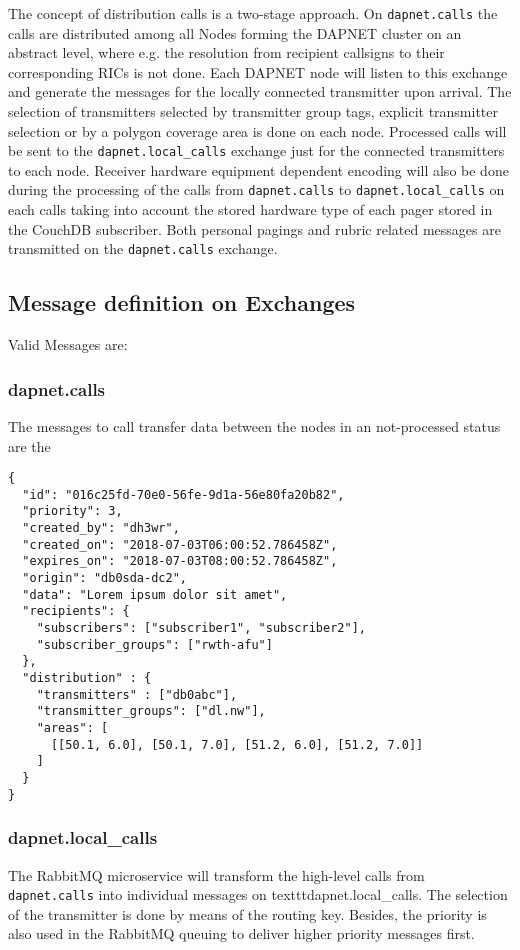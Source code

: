 The concept of distribution calls is a two-stage approach. On \texttt{dapnet.calls} the calls are distributed among all Nodes forming the DAPNET cluster on an abstract level, where e.g. the resolution from recipient callsigns to their corresponding RICs is not done. Each DAPNET node will listen to this exchange and generate the messages for the locally connected transmitter upon arrival. The selection of transmitters selected by transmitter group tags, explicit transmitter selection or by a polygon coverage area is done on each node. Processed calls will be sent to the \texttt{dapnet.local\_calls} exchange just for the connected transmitters to each node. Receiver hardware equipment dependent encoding will also be done during the processing of the calls from \texttt{dapnet.calls} to \texttt{dapnet.local\_calls} on each calls taking into account the stored hardware type of each pager stored in the CouchDB subscriber. Both personal pagings and rubric related messages are transmitted on the \texttt{dapnet.calls} exchange.


\subsection{Message definition on Exchanges}
\label{protocoldef:RabbitMQ:exchangesdifinition}


Valid Messages are:

\subsubsection{dapnet.calls}
\label{protocoldef:RabbitMQ:dapnet.calls}
The messages to call transfer data between the nodes in an not-processed status are the
\begin{lstlisting}
{
  "id": "016c25fd-70e0-56fe-9d1a-56e80fa20b82",
  "priority": 3,
  "created_by": "dh3wr",
  "created_on": "2018-07-03T06:00:52.786458Z",
  "expires_on": "2018-07-03T08:00:52.786458Z",
  "origin": "db0sda-dc2",
  "data": "Lorem ipsum dolor sit amet",
  "recipients": {
    "subscribers": ["subscriber1", "subscriber2"],
    "subscriber_groups": ["rwth-afu"]
  },
  "distribution" : {
    "transmitters" : ["db0abc"],
    "transmitter_groups": ["dl.nw"],
    "areas": [
      [[50.1, 6.0], [50.1, 7.0], [51.2, 6.0], [51.2, 7.0]]
    ]
  }
}
\end{lstlisting}

\subsubsection{dapnet.local\_calls}
\label{protocoldef:RabbitMQ:dapnet.local_calls}
The RabbitMQ microservice will transform the high-level calls from \texttt{dapnet.calls} into individual messages on texttt{dapnet.local\_calls}. The selection of the transmitter is done by means of the routing key. Besides, the priority is also used in the RabbitMQ queuing to deliver higher priority messages first.

